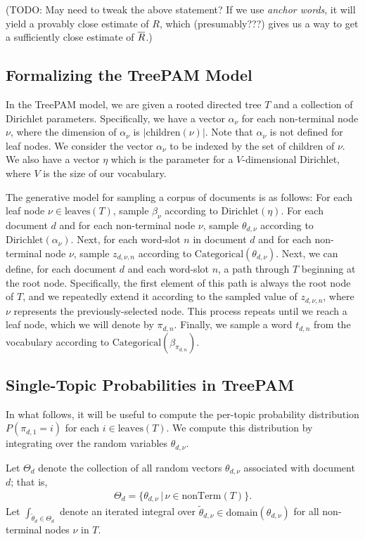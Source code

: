 \documentclass{article}
\theoremstyle{definition}
\newcommand{\Dirichlet}{\text{Dirichlet}}
\newcommand{\Categorical}{\text{Categorical}}
\newcommand{\leaves}{\text{leaves}}
\newcommand{\nonTerm}{\text{nonTerm}}
\newcommand{\domain}{\text{domain}}
\begin{document}
(TODO: May need to tweak the above statement?  If we use \emph{anchor words}, it will yield a provably close estimate of $R$, which (presumably???) gives us a way to get a sufficiently close estimate of $\overline{R}$.)

\subsection{Formalizing the TreePAM Model}

In the TreePAM model, we are given a rooted directed tree $T$ and a collection of Dirichlet parameters.
Specifically, we have a vector $\alpha_\nu$ for each non-terminal node $\nu$, where the dimension of $\alpha_\nu$ is $|\text{children}(\nu)|$.
Note that $\alpha_\nu$ is not defined for leaf nodes.
We consider the vector $\alpha_\nu$ to be indexed by the set of children of $\nu$.
We also have a vector $\eta$ which is the parameter for a $V$-dimensional Dirichlet, where $V$ is the size of our vocabulary.

The generative model for sampling a corpus of documents is as follows:
For each leaf node $\nu \in \leaves(T)$, sample $\beta_\nu$ according to $\Dirichlet(\eta)$.
For each document $d$ and for each non-terminal node $\nu$, sample $\theta_{d,\nu}$ according to $\Dirichlet(\alpha_\nu)$.
Next, for each word-slot $n$ in document $d$ and for each non-terminal node $\nu$, sample $z_{d,\nu,n}$ according to $\Categorical(\theta_{d,\nu})$.
Next, we can define, for each document $d$ and each word-slot $n$, a path through $T$ beginning at the root node.
Specifically, the first element of this path is always the root node of $T$, and we repeatedly extend it according to the sampled value of $z_{d,\nu,n}$, where $\nu$ represents the previously-selected node.
This process repeats until we reach a leaf node, which we will denote by $\pi_{d,n}$.
Finally, we sample a word $t_{d,n}$ from the vocabulary according to $\Categorical(\beta_{\pi_{d,n}})$.

\subsection{Single-Topic Probabilities in TreePAM}

In what follows, it will be useful to compute the per-topic probability distribution $P(\pi_{d,1} = i)$ for each $i \in \leaves(T)$.
We compute this distribution by integrating over the random variables $\theta_{d,\nu}$.

Let $\Theta_d$ denote the collection of all random vectors $\theta_{d,\nu}$ associated with document $d$; that is,
\begin{align*}
\Theta_d = \{\theta_{d,\nu} \, | \, \nu \in \nonTerm(T) \}.
\end{align*}
Let $\int_{\tilde \theta_d \in \Theta_d}$ denote an iterated integral over $\tilde \theta_{d,\nu} \in \domain(\theta_{d,\nu})$ for all non-terminal nodes $\nu$ in $T$.
\end{document}
